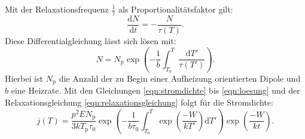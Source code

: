Mit der Relaxationsfrequenz $\frac{1}{\tau}$ als Proportionalitätsfaktor gilt:
\begin{equation}
  \frac{\mathrm{d}N}{\mathrm{d}t}=-\frac{N}{\tau(T)}\label{eqn:dgl}.
\end{equation}
Diese Differentialgleichung lässt sich lösen mit:
\begin{equation}
  N= N_\mathrm{p}\exp\left({-\frac{1}{b}\int_{T_\mathrm{0}}^{T} \frac{\mathrm{d}T'}{\tau(T')}}\right)\label{eqn:loesung}.
\end{equation}
Hierbei ist $N_\mathrm{p}$ die Anzahl der zu Begin einer Aufheizung orientierten Dipole und
$b$ eine Heizrate. Mit den Gleichungen \eqref{eqn:stromdichte} bis \eqref{eqn:loesung}
und der Relaxationsgleichung \eqref{eqn:relaxationsgleichung} folgt für die Stromdichte:
\begin{equation}
j(T)=\frac{p^2EN_\mathrm{p}}{3kT_\mathrm{p}\tau_{0}}\exp\left(-\frac{1}{b\tau_\mathrm{0}}\int_{T_\mathrm{0}}^{T}\exp\left(\frac{-W}{kT'}\right)\mathrm{d}T'\right)\exp\left(\frac{-W}{kt}\right). \label{eqn:8}
\end{equation}
